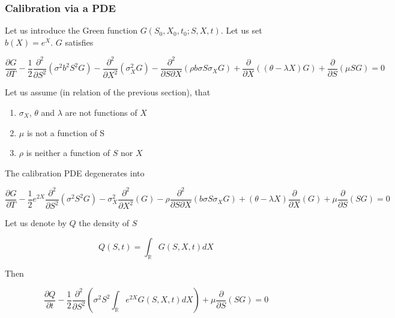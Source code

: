 \documentclass{article}
\begin{document}
\subsubsection{Calibration via a PDE}
\noindent Let us introduce the Green function $G(S_0, X_0, t_0 ; S, X, t)$.  Let us set $b(X) = e^{X}$. $G$ satisfies

\begin{equation}
	\frac{\partial G}{\partial T} 
- \frac{1}{2} \frac{\partial^2}{\partial S^2} \left(\sigma^2 b^2 S^2 G\right) 
- \frac{\partial^2}{\partial X^2} \left( \sigma_X^2 G\right) 
- \frac{\partial^2}{\partial S \partial X} \left(\rho b \sigma S \sigma_X G \right) 
+ \frac{\partial }{\partial X}\left( (\theta - \lambda X) G\right) 
+ \frac{\partial }{\partial S}(\mu S G)
 = 0
\end{equation}

\noindent Let us assume (in relation of the previous section), that 
\begin{enumerate}
	\item $\sigma_X$, $\theta$ and $\lambda$ are not functions of $X$
	\item $\mu$ is not a function of S
	\item $\rho$ is neither a function of $S$ nor $X$
\end{enumerate}

\noindent The calibration PDE degenerates into 

\begin{equation}
	\frac{\partial G}{\partial T} 
- \frac{1}{2} e^{2X }\frac{\partial^2}{\partial S^2} \left(\sigma^2 S^2 G\right) 
- \sigma_X^2 \frac{\partial^2}{\partial X^2} \left( G\right) 
- \rho \frac{\partial^2}{\partial S \partial X} \left(b \sigma S \sigma_X G \right) 
+ \left(\theta - \lambda X\right) \frac{\partial }{\partial X}\left( G\right) 
+ \mu \frac{\partial }{\partial S}(S G)
 = 0
\end{equation}

\noindent Let us denote by $Q$ the density of $S$

\begin{equation}
	Q(S,t) = \int_\mathbb{R} G(S,X,t) dX
\end{equation}

\noindent Then

\begin{equation}
	\frac{\partial Q}{\partial t} - \frac{1}{2} \frac{\partial^2}{\partial S^2} \left(\sigma^2 S^2 \int_\mathbb{R} e^{2X} G(S,X,t) dX \right) + \mu \frac{\partial }{\partial S}(S G) = 0
\end{equation}
\end{document}

